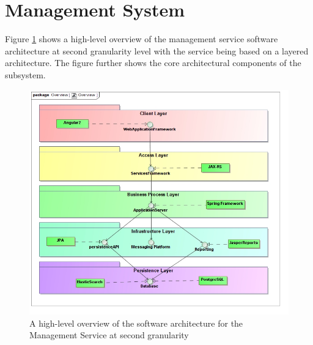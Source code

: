 \section{Management System}
Figure \ref{fig:managementSoftwareArchitecture} shows a high-level overview of
the management service software architecture at second granularity level with the
service being based on a layered architecture. The figure further shows the core
architectural components of the subsystem.
\begin{figure}[H]
  \begin{center}
  \includegraphics[scale=0.4]{../Diagrams and Charts/Overview/Overview.jpg}
  \caption{A high-level overview of the software architecture for the Management Service at second granularity}
  \label{fig:managementSoftwareArchitecture}
  \end{center}
\end{figure}


